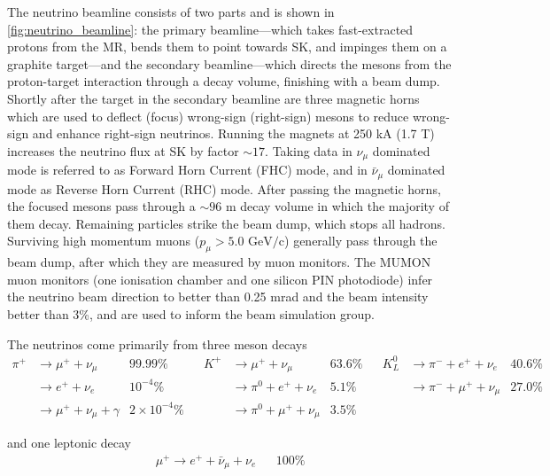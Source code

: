 The neutrino beamline consists of two parts and is shown in \autoref{fig:neutrino_beamline}: the primary beamline---which takes fast-extracted protons from the MR, bends them to point towards SK, and impinges them on a graphite target---and the secondary beamline---which directs the mesons from the proton-target interaction through a decay volume, finishing with a beam dump. Shortly after the target in the secondary beamline are three magnetic horns\cite{t2k_horns} which are used to deflect (focus) wrong-sign (right-sign) mesons to reduce wrong-sign and enhance right-sign neutrinos. Running the magnets at 250 kA (1.7 T) increases the neutrino flux at SK by factor $\sim17$\cite{t2k_beam}. Taking data in $\nu_\mu$ dominated mode is referred to as Forward Horn Current (FHC) mode, and in $\bar{\nu}_\mu$ dominated mode as Reverse Horn Current (RHC) mode. After passing the magnetic horns, the focused mesons pass through a $\sim96$ m decay volume in which the majority of them decay. Remaining particles strike the beam dump, which stops all hadrons. Surviving high momentum muons ($p_\mu > 5.0 \text{ GeV/c}$) generally pass through the beam dump, after which they are measured by muon monitors. The MUMON muon monitors (one ionisation chamber and one silicon PIN photodiode) infer the neutrino beam direction to better than 0.25 mrad and the beam intensity better than 3\%\cite{t2k_mumon,t2k_mumon2}, and are used to inform the beam simulation group.

The neutrinos come primarily from three meson decays
\begin{align*}
	\pi^+ & \rightarrow \mu^+ + \nu_\mu 		&  99.99\% 			& & K^+ & \rightarrow \mu^+ + \nu_\mu 			& 63.6\% & & K^0_L & \rightarrow \pi^- + e^+ + \nu_e 	  & 40.6\% \\
	      & \rightarrow e^+ + \nu_e 			&  10^{-4}\%		& &		& \rightarrow \pi^0 + e^+ + \nu_e 		& 5.1\%  & &	   & \rightarrow \pi^- + \mu^+ + \nu_\mu &  27.0\% \\
	      & \rightarrow \mu^+ + \nu_\mu + \gamma & 2\times 10^{-4}\%  & &		& \rightarrow \pi^0 + \mu^+ + \nu_\mu  	& 3.5\%  & &	   & & 		 &
\end{align*}

and one leptonic decay\cite{pdg_2017}
\begin{align*}
\mu^+ \rightarrow e^+ + \bar{\nu}_\mu + \nu_e & & 100\%
\end{align*}

